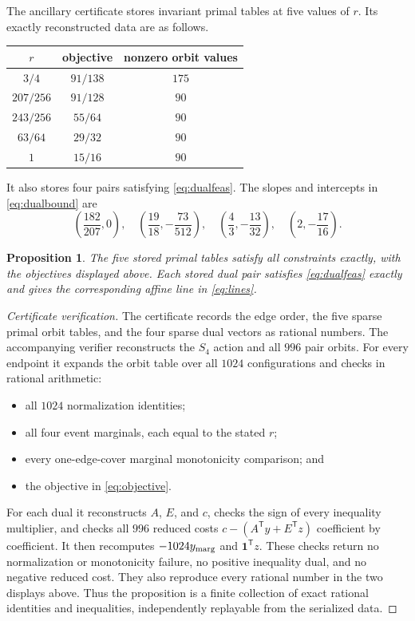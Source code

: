 \documentclass[11pt]{article}
\newtheorem{proposition}[theorem]{Proposition}
\begin{document}
The ancillary certificate stores invariant primal tables at five values of
$r$.  Its exactly reconstructed data are as follows.
\begin{center}
\begin{tabular}{ccc}
\toprule
$r$ & objective & nonzero orbit values\\
\midrule
$3/4$       & $91/138$ & $175$\\
$207/256$   & $91/128$ & $90$\\
$243/256$   & $55/64$  & $90$\\
$63/64$     & $29/32$  & $90$\\
$1$         & $15/16$  & $90$\\
\bottomrule
\end{tabular}
\end{center}
It also stores four pairs satisfying \eqref{eq:dualfeas}.  The slopes and
intercepts in \eqref{eq:dualbound} are
\begin{equation}\label{eq:lines}
 \left(\frac{182}{207},0\right),\quad
 \left(\frac{19}{18},-\frac{73}{512}\right),\quad
 \left(\frac43,-\frac{13}{32}\right),\quad
 \left(2,-\frac{17}{16}\right).
\end{equation}

\begin{proposition}\label{prop:certificate}
The five stored primal tables satisfy all constraints exactly, with the
objectives displayed above.  Each stored dual pair satisfies
\eqref{eq:dualfeas} exactly and gives the corresponding affine line in
\eqref{eq:lines}.
\end{proposition}

\begin{proof}[Certificate verification]
The certificate records the edge order, the five sparse primal orbit tables,
and the four sparse dual vectors as rational numbers.  The accompanying
verifier reconstructs the $S_4$ action and all $996$ pair orbits.  For every
endpoint it expands the orbit table over all $1024$ configurations and checks
in rational arithmetic:
\begin{itemize}
\item all $1024$ normalization identities;
\item all four event marginals, each equal to the stated $r$;
\item every one-edge-cover marginal monotonicity comparison; and
\item the objective in \eqref{eq:objective}.
\end{itemize}
For each dual it reconstructs $A$, $E$, and $c$, checks the sign of every
inequality multiplier, and checks all $996$ reduced costs
$c-(A^{\mathsf T}y+E^{\mathsf T}z)$ coefficient by coefficient.  It then
recomputes $-1024y_{\rm marg}$ and $\mathbf1^{\mathsf T}z$.  These checks
return no normalization or monotonicity failure, no positive inequality dual,
and no negative reduced cost.  They also reproduce every rational number in
the two displays above.  Thus the proposition is a finite collection of exact
rational identities and inequalities, independently replayable from the
serialized data.
\end{proof}
\end{document}
